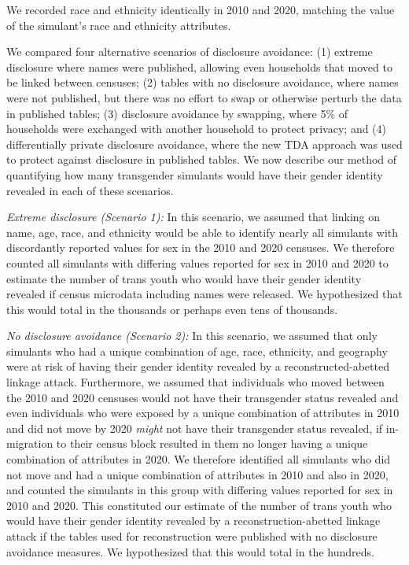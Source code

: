 \documentclass{jpc} %
\theoremstyle{plain}\newtheorem{satz}[thm]{Satz} %
\begin{document}
We recorded race and ethnicity identically in 2010 and 2020, matching the value of the simulant's race and ethnicity attributes.

We compared four alternative scenarios of disclosure avoidance: (1) extreme disclosure where names were published, allowing even households that moved to be linked between censuses; (2) tables with no disclosure avoidance, where names were not published, but there was no effort to swap or otherwise perturb the data in published tables; (3) disclosure avoidance by swapping, where 5\% of households were exchanged with another household to protect privacy; and (4) differentially private disclosure avoidance, where the new TDA approach was used to protect against disclosure in published tables.  We now describe our method of quantifying how many transgender simulants would have their gender identity revealed in each of these scenarios.

\emph{Extreme disclosure (Scenario 1):} In this scenario, we assumed that linking on name, age, race, and ethnicity would be able to identify nearly all simulants with discordantly reported values for sex in the 2010 and 2020 censuses.  We therefore counted all simulants with differing values reported for sex in 2010 and 2020 to estimate the number of trans youth who would have their gender identity revealed if census microdata including names were released.  We hypothesized that this would total in the thousands or perhaps even tens of thousands.

\emph{No disclosure avoidance (Scenario 2):} In this scenario, we assumed that only simulants who had a unique combination of age, race, ethnicity, and geography were at risk of having their gender identity revealed by a reconstructed-abetted linkage attack.  Furthermore, we assumed that individuals who moved between the 2010 and 2020 censuses would not have their transgender status revealed and even individuals who were exposed by a unique combination of attributes in 2010 and did not move by 2020 \emph{might} not have their transgender status revealed, if in-migration to their census block resulted in them no longer having a unique combination of attributes in 2020.  We therefore identified all simulants who did not move and had a unique combination of attributes in 2010 and also  in 2020, and counted the simulants in this group with differing values reported for sex in 2010 and 2020.  This constituted our estimate of the number of trans youth who would have their gender identity revealed by a reconstruction-abetted linkage attack if the tables used for reconstruction were published with no disclosure avoidance measures.
We hypothesized that this would total in the hundreds.
\end{document}

